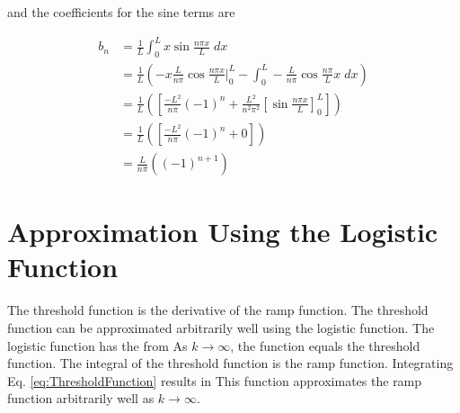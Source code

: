 and the coefficients for the sine terms are 


\begin{equation}
 \begin{split} 
     b_n &= \frac{1}{L} \int_{0}^{L} x \sin{\frac{n \pi x}{L}} \; dx \\ 
         &=  \frac{1}{L} \left(-x \frac{L}{n \pi}   \cos{\frac{n \pi x}{L}}  \bigg|^{L}_0  - \int_0^L -\frac{L}{n \pi}\cos{\frac{n \pi}{L} x} \; dx  \right) \\
         &= \frac{1}{L} \left( \left[ \frac{-L^2}{n \pi} (-1)^n  +\frac{L^2}{n^2 \pi^2}   \left[ \sin{\frac{n \pi x}{L}} \right]_0^L  \right] \right) \\
         &= \frac{1}{L} \left( \left[ \frac{-L^2}{n \pi} (-1)^n  + 0 \right] \right) \\
         &= \frac{L}{n \pi}\left( (-1)^{n+1} \right)
 \end{split}
\end{equation}

\section{Approximation Using the Logistic Function}

The threshold function is the derivative of the ramp function. The
threshold function can be approximated arbitrarily well using the
logistic function. The logistic function has the from
As \(k\to\infty\), the function equals the threshold function. The
integral of the threshold function is the ramp function. Integrating 
Eq. \ref{eq:ThresholdFunction} results in 
This function approximates the ramp function arbitrarily well as
\(k\to\infty\). 




